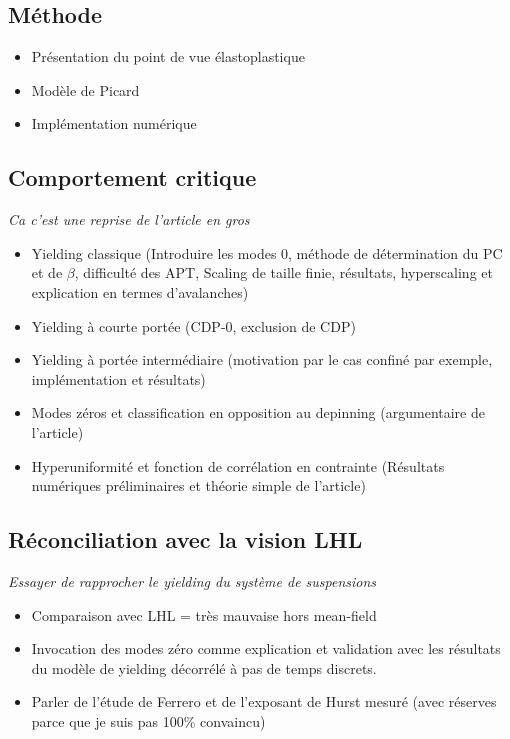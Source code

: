 \documentclass[10pt,a4paper]{article}
\begin{document}
\subsection{Méthode}

\begin{itemize}
	\item Présentation du point de vue élastoplastique
	\item Modèle de Picard
	\item Implémentation numérique
\end{itemize}

\subsection{Comportement critique}

\textit{Ca c'est une reprise de l'article en gros}

\begin{itemize}
	\item Yielding classique (Introduire les modes 0, méthode de détermination du PC et de $\beta$, difficulté des APT, Scaling de taille finie, résultats, hyperscaling et explication en termes d'avalanches)
	\item Yielding à courte portée (CDP-0, exclusion de CDP)
	\item Yielding à portée intermédiaire (motivation par le cas confiné par exemple, implémentation et résultats)
	\item Modes zéros et classification en opposition au depinning (argumentaire de l'article)
	\item Hyperuniformité et fonction de corrélation en contrainte (Résultats numériques préliminaires et théorie simple de l'article)
\end{itemize}

\subsection{Réconciliation avec la vision LHL}

\textit{Essayer de rapprocher le yielding du système de suspensions}

\begin{itemize}
	\item Comparaison avec LHL = très mauvaise hors mean-field
	\item Invocation des modes zéro comme explication et validation avec les résultats du modèle de yielding décorrélé à pas de temps discrets.
	\item Parler de l'étude de Ferrero et de l'exposant de Hurst mesuré (avec réserves parce que je suis pas 100\% convaincu)
\end{itemize}
\end{document}

